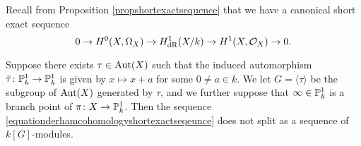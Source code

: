 
    Recall from Proposition \ref{propshortexactsequence} that we have a canonical short exact sequence
        \begin{equation}\label{equationderhamcohomologyshortexactseqeunce}
        0 \rightarrow {H^0(X,\Omega_X)} \rightarrow H_{\text {dR}}^1(X/k) \rightarrow H^1(X,\mathcal{O}_X) \rightarrow 0.
        \end{equation}
        
    \begin{thm}\label{theoremsplittingtheorem}
    Suppose there exists $\tau \in \operatorname{Aut}(X)$ such that the induced automorphism $\bar \tau \colon \mathbb P_k^1 \rightarrow \mathbb P_k^1$ is given by $x \mapsto x+a$ for some $0 \neq a \in k$.
    We let $G = \langle \tau \rangle$ be the subgroup of $\operatorname{Aut}(X)$ generated by $\tau$, and we further suppose that $\infty \in {\mathbb P}_k^1$ is a branch point of $\pi \colon X \rightarrow {\mathbb P}_k^1$.
    Then the sequence \eqref{equationderhamcohomologyshortexactseqeunce} does not split as a sequence of $k[G]$-modules.
    \end{thm}
